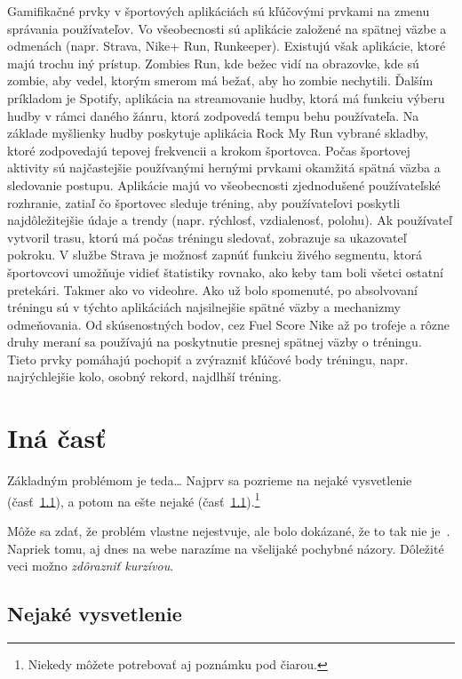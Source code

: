 \documentclass[10pt,twoside,slovak,a4paper]{article}
\begin{document}
Gamifikačné prvky v športových aplikáciách sú kľúčovými prvkami na zmenu správania používateľov. Vo všeobecnosti sú aplikácie založené na spätnej väzbe a odmenách (napr. Strava, Nike+ Run, Runkeeper). Existujú však aplikácie, ktoré majú trochu iný prístup. Zombies Run, kde bežec vidí na obrazovke, kde sú zombie, aby vedel, ktorým smerom má bežať, aby ho zombie nechytili. Ďalším príkladom je Spotify, aplikácia na streamovanie hudby, ktorá má funkciu výberu hudby v rámci daného žánru, ktorá zodpovedá tempu behu používateľa. Na základe myšlienky hudby poskytuje aplikácia Rock My Run vybrané skladby, ktoré zodpovedajú tepovej frekvencii a krokom športovca. Počas športovej aktivity sú najčastejšie používanými hernými prvkami okamžitá spätná väzba a sledovanie postupu. Aplikácie majú vo všeobecnosti zjednodušené používateľské rozhranie, zatiaľ čo športovec sleduje tréning, aby používateľovi poskytli najdôležitejšie údaje a trendy (napr. rýchlosť, vzdialenosť, polohu). Ak používateľ vytvoril trasu, ktorú má počas tréningu sledovať, zobrazuje sa ukazovateľ pokroku. V službe Strava je možnosť zapnúť funkciu živého segmentu, ktorá športovcovi umožňuje vidieť štatistiky rovnako, ako keby tam boli všetci ostatní pretekári. Takmer ako vo videohre.
Ako už bolo spomenuté, po absolvovaní tréningu sú v týchto aplikáciách najsilnejšie spätné väzby a mechanizmy odmeňovania. Od skúsenostných bodov, cez Fuel Score Nike až po trofeje a rôzne druhy meraní sa používajú na poskytnutie presnej spätnej väzby o tréningu. Tieto prvky pomáhajú pochopiť a zvýrazniť kľúčové body tréningu, napr. najrýchlejšie kolo, osobný rekord, najdlhší tréning.

\cite{Coplien:MPD}

\section{Iná časť} \label{ina}

Základným problémom je teda\ldots{} Najprv sa pozrieme na nejaké vysvetlenie (časť~\ref{ina:nejake}), a potom na ešte nejaké (časť~\ref{ina:nejake}).\footnote{Niekedy môžete potrebovať aj poznámku pod čiarou.}

Môže sa zdať, že problém vlastne nejestvuje\cite{Coplien:MPD}, ale bolo dokázané, že to tak nie je~\cite{Czarnecki:Staged, Czarnecki:Progress}. Napriek tomu, aj dnes na webe narazíme na všelijaké pochybné názory\cite{PLP-Framework}. Dôležité veci možno \emph{zdôrazniť kurzívou}.


\subsection{Nejaké vysvetlenie} \label{ina:nejake}
\end{document}
